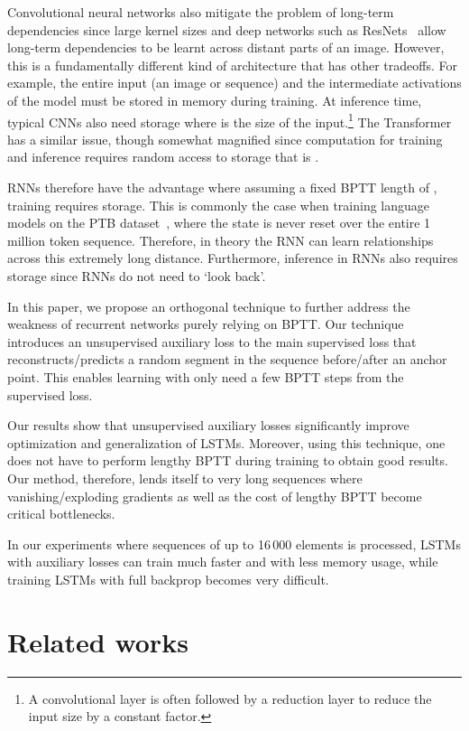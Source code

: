 \documentclass{article}
\begin{document}
Convolutional neural networks also mitigate the problem of long-term dependencies since large kernel sizes and deep networks such as ResNets~\cite{he2016deep} allow long-term dependencies to be learnt across distant parts of an image. However, this is a fundamentally different kind of architecture that has other tradeoffs. For example, the entire input  (an image or sequence) and the intermediate activations of the model must be stored in memory during training. At inference time, typical CNNs also need  storage where  is the size of the input.\footnote{A convolutional layer is often followed by a reduction layer to reduce the input size by a constant factor.} The Transformer~\cite{vaswani2017attention} has a similar issue, though somewhat magnified since computation for training and inference requires random access to storage that is .

RNNs therefore have the advantage where assuming a fixed BPTT length of , training requires  storage. This is commonly the case when training language models on the PTB dataset~\cite{penntreebank}, where the state is never reset over the entire 1 million token sequence. Therefore, in theory the RNN can learn relationships across this extremely long distance. Furthermore, inference in RNNs also requires  storage since RNNs do not need to `look back'.


In this paper, we propose an orthogonal technique to further address the weakness of recurrent networks purely relying on BPTT. Our technique introduces an unsupervised auxiliary loss to the main supervised loss that reconstructs/predicts a random segment in the sequence before/after an anchor point. This enables learning with only need a few BPTT steps from the supervised loss.


Our results show that unsupervised auxiliary losses significantly improve optimization and generalization of LSTMs. Moreover, using this technique, one does not have to perform lengthy BPTT during training to obtain good results. Our method, therefore, lends itself to very long sequences where vanishing/exploding gradients as well as the cost of lengthy BPTT become critical bottlenecks. 

In our experiments where sequences of up to 16\,000 elements is processed, LSTMs with auxiliary losses can train much faster and with less memory usage, while training LSTMs with full backprop becomes very difficult.

\section{Related works}
\end{document}
